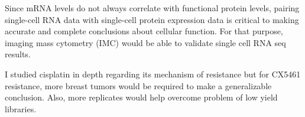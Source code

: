 Since mRNA levels do not always correlate with functional protein levels, pairing single-cell RNA data with single-cell protein expression data is critical to making accurate and complete conclusions about cellular function.
For that purpose, imaging mass cytometry (IMC) would be able to validate single cell RNA seq results.

I studied cisplatin in depth regarding its mechanism of resistance but for CX5461 resistance, more breast tumors would be required to make a generalizable conclusion. Also, more replicates would help overcome problem of low yield libraries.













